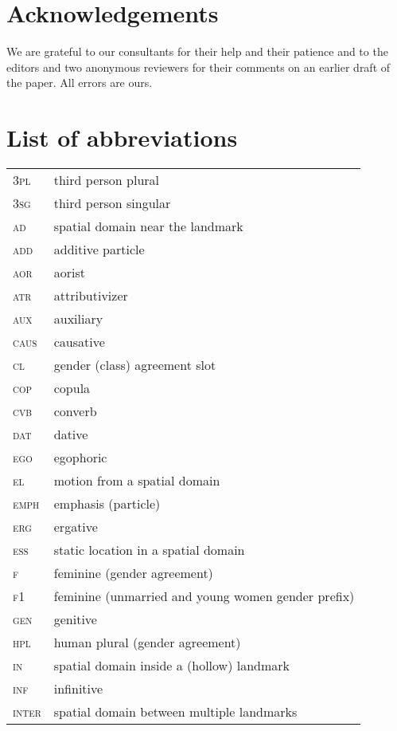 ﻿\documentclass[output=paper]{langsci/langscibook}
\begin{document}
\section*{Acknowledgements}

We are grateful to our consultants for their help and their patience
and to the editors and two anonymous reviewers for their comments on
an earlier draft of the paper. All errors are ours.

\section*{List of abbreviations}

\begin{longtable}[l]{@{}ll@{}}
\textsc{3pl}	& third person plural \\
\textsc{3sg}	& third person singular \\
\textsc{ad}	& spatial domain near the landmark \\
\textsc{add}	& additive particle \\
\textsc{aor}	& aorist \\
\textsc{atr}	& attributivizer \\
\textsc{aux}	& auxiliary \\
\textsc{caus}	& causative \\
\textsc{cl}	& gender (class) agreement slot \\
\textsc{cop}	& copula \\
\textsc{cvb}	& converb \\
\textsc{dat}	& dative \\
\textsc{ego}	& egophoric \\
\textsc{el}	& motion from a spatial domain \\
\textsc{emph}	& emphasis (particle) \\
\textsc{erg}	& ergative \\
\textsc{ess}	& static location in a spatial domain \\
\textsc{f}	& feminine (gender agreement) \\
\textsc{f1}	& feminine (unmarried and young women gender prefix) \\
\textsc{gen}	& genitive \\
\textsc{hpl}	& human plural (gender agreement) \\
\textsc{in}	& spatial domain inside a (hollow) landmark \\
\textsc{inf}	& infinitive \\
\textsc{inter}	& spatial domain between multiple landmarks \\

\end{longtable}
\end{document}
